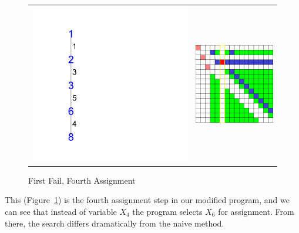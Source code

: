 \begin{figure}[h]
\caption{\label{nqueen:ff fourth assignment} First Fail, Fourth Assignment}
\begin{center}
\begin{tabular}{cc}
\includegraphics[width=8cm]{../nqueen/first_fail/tree_expanded_5}
&
\includegraphics[width=4cm]{../nqueen/first_fail/frame5}
\end{tabular}
\end{center}
\end{figure}
This (Figure~\ref{nqueen:ff fourth assignment}) is the fourth assignment step in our modified program, and we can see that instead of variable $X_4$ the program selects $X_6$ for assignment. From there, the search differs dramatically from the naive method.

